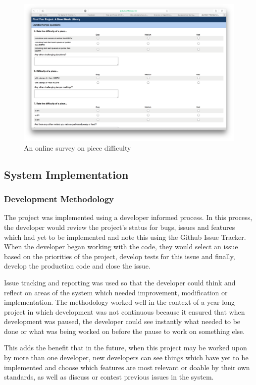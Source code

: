 \begin{figure}[H]
\centering
\includegraphics[width=400pt]{survey_difficulty}
\caption{An online survey on piece difficulty}
\label{fig:survey_difficulty}	
\end{figure}



\subsection{System Implementation}
\subsubsection{Development Methodology}
The project was implemented using a developer informed process. In this process, the developer would review the project's status for bugs, issues and features which had yet to be implemented and note this using the Github Issue Tracker. When the developer began working with the code, they would select an issue based on the priorities of the project, develop tests for this issue and finally, develop the production code and close the issue.


Issue tracking and reporting was used so that the developer could think and reflect on areas of the system which needed improvement, modification or implementation. The methodology worked well in the context of a year long project in which development was not continuous because it ensured that when development was paused, the developer could see instantly what needed to be done or what was being worked on before the pause to work on something else. 

This adds the benefit that in the future, when this project may be worked upon by more than one developer, new developers can see things which have yet to be implemented and choose which features are most relevant or doable by their own standards, as well as discuss or contest previous issues in the system.


